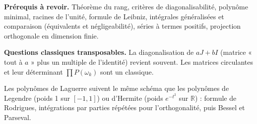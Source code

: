 \documentclass[11pt,a4paper]{article}
\begin{document}
\textbf{Prérequis à revoir.} Théorème du rang, critères de diagonalisabilité, polynôme minimal, racines de l'unité, formule de Leibniz, intégrales généralisées et comparaison (équivalents et négligeabilité), séries à termes positifs, projection orthogonale en dimension finie.

\textbf{Questions classiques transposables.} La diagonalisation de \(aJ+bI\) (matrice « tout à \(a\) » plus un multiple de l'identité) revient souvent. Les matrices circulantes et leur déterminant \(\prod P(\omega_k)\) sont un classique.

Les polynômes de Laguerre suivent le même schéma que les polynômes de Legendre (poids 1 sur \([-1,1]\)) ou d'Hermite (poids \(e^{-t^2}\) sur \(\mathbb R\)) : formule de Rodrigues, intégrations par parties répétées pour l'orthogonalité, puis Bessel et Parseval.
\end{document}
